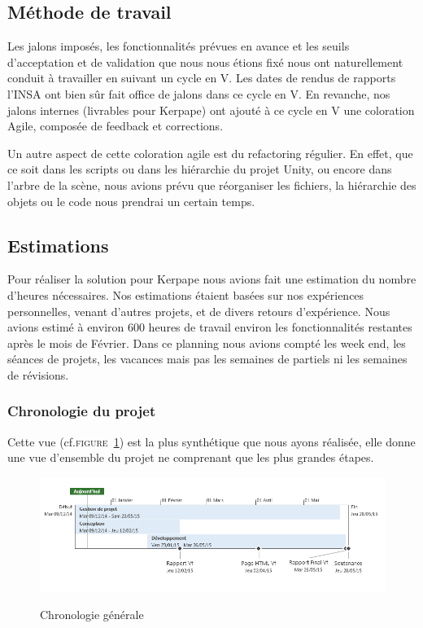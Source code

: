 \subsection{Méthode de travail}

Les jalons imposés, les fonctionnalités prévues en avance et les seuils d'acceptation et de validation que nous nous étions fixé nous ont naturellement conduit à travailler en suivant un cycle en V.
Les dates de rendus de rapports l'INSA ont bien sûr fait office de jalons dans ce cycle en V.
En revanche, nos jalons internes (livrables pour Kerpape) ont ajouté à ce cycle en V une coloration Agile, composée de feedback et corrections.

Un autre aspect de cette coloration agile est du refactoring régulier.
En effet, que ce soit dans les scripts ou dans les hiérarchie du projet Unity, ou encore dans l'arbre de la scène, nous avions prévu que réorganiser les fichiers, la hiérarchie des objets ou le code nous prendrai un certain temps.

\subsection{Estimations}

Pour réaliser la solution pour Kerpape nous avions fait une estimation du nombre d'heures nécessaires.
Nos estimations étaient basées sur nos expériences personnelles, venant d'autres projets, et de divers retours d'expérience.
Nous avions estimé à environ 600 heures de travail environ les fonctionnalités restantes après le mois de Février.
Dans ce planning nous avions compté les week end, les séances de projets, les vacances mais pas les semaines de partiels ni les semaines de révisions.

\subsubsection{Chronologie du projet}
Cette vue (cf.\textsc{figure~\ref{fig:timeline}}) est la plus synthétique que nous ayons réalisée, elle donne une vue d’ensemble du projet ne comprenant que les plus grandes étapes. 
\begin{figure}[h]
	\centering
	\caption{Chronologie générale}
		\includegraphics[width=\textwidth]{8-BilanPlanification/img/timeline.PNG}
	\label{fig:timeline}
\end{figure}

